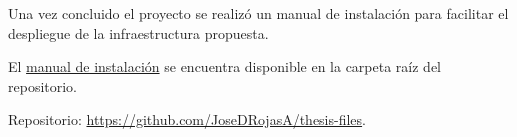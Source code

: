 \newpage
{}\label{appendix:Manual de instalacion}
Una vez concluido el proyecto se realiz\'o un manual de instalaci\'on para facilitar el despliegue de la infraestructura propuesta.

\noindent El \href{https://github.com/JoseDRojasA/thesis-files/raw/master/Manual de instalación.pdf}{manual de instalaci\'on} se encuentra disponible en la carpeta ra\'iz del repositorio.

\noindent Repositorio: \url{https://github.com/JoseDRojasA/thesis-files}.
